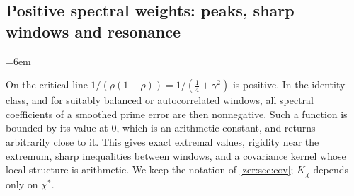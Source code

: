 \subsection{Positive spectral weights: peaks, sharp windows and resonance}\label{zer:sec:peaks}
{\emergencystretch=6em}

On the critical line $1/(\rho(1-\rho))=1/(\tfrac14+\gamma^2)$ is positive. In the identity class,
and for suitably balanced or autocorrelated windows, all spectral coefficients of a smoothed
prime error are then nonnegative. Such a function is bounded by its value at $0$, which is an
arithmetic constant, and returns arbitrarily close to it. This gives exact extremal values,
rigidity near the extremum, sharp inequalities between windows, and a covariance kernel whose
local structure is arithmetic. We keep the notation of \cref{zer:sec:cov}; $K_\chi$ depends only
on $\chi^*$.

